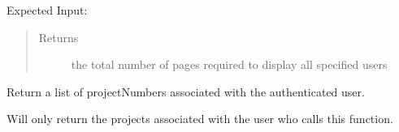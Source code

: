 \documentclass[letterpaper,10pt,english]{sphinxmanual}
\begin{document}
\begin{fulllineitems}
\begin{fulllineitems}
Expected Input:

\begin{sphinxVerbatim}[commandchars=\\\{\}]
          
      
      
      
      
      
      
\end{sphinxVerbatim}
\begin{quote}\begin{description}
\item[{Returns}] \leavevmode
the total number of pages required to display all specified users

\end{description}\end{quote}

\end{fulllineitems}


\begin{fulllineitems}
\label{\detokenize{apidoc/utdesign_procurement:utdesign_procurement.apigateway.ApiGateway.userProjects}}
Return a list of projectNumbers associated with
the authenticated user.

Will only return the projects associated with the user
who calls this function.


\end{fulllineitems}
\end{fulllineitems}
\end{document}
